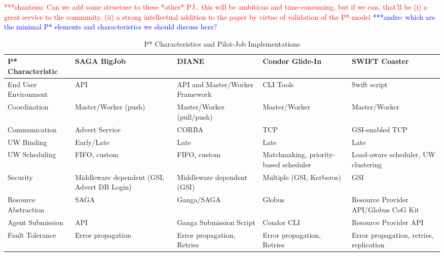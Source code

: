 \documentclass[conference,final]{IEEEtran}
\newcommand{\jhanote}[1]{ {\textcolor{red} { ***shantenu: #1 }}}
\newcommand{\alnote}[1]{ {\textcolor{blue} { ***andre: #1 }}}
\newcommand{\alnote}[1]{}
\newcommand{\jhanote}[1]{}
\begin{document}
\jhanote{Can we add some structure to these *other* PJ.. this will be
  ambitious and time-consuming, but if we can, that'll be (i) a great
  service to the community, (ii) a strong intellectual addition to the
  paper by virtue of validation of the P*-model} \alnote{which are the minimal P* elements and characteristics we should discuss here?}



\begin{table}[t]
\centering
\begin{tabular}{|l|p{2.5cm}|p{2.5cm}|p{2.5cm}|p{2.5cm}|}
	\hline
	\textbf{P* Characteristic}
	&\textbf{SAGA BigJob} &\textbf{DIANE} &\textbf{Condor Glide-In} &   
	\textbf{SWIFT Coaster} \\ \hline
End User Environment &API &API and Master/Worker Framework &CLI Tools &Swift script\\ \hline

Coordination &Master/Worker (push) &Master/Worker (pull/push) &Master/Worker &Master/Worker \\ \hline
	
Communication &Advert Service &CORBA &TCP &GSI-enabled TCP \\ \hline

UW Binding &Early/Late &Late &Late &Late\\
\hline
UW Scheduling &FIFO, custom &FIFO, custom &Matchmaking, priority-based scheduler 
&Load-aware scheduler, UW clustering\\
\hline

Security &Middleware dependent (GSI, Advert DB Login) &Middleware dependent (GSI) &Multiple (GSI, 
Kerberos) &GSI\\ \hline

Resource Abstraction &SAGA &Ganga/SAGA &Globus &Resource Provider API/Globus CoG 
Kit \\ 
\hline
Agent Submission &API &Ganga Submission Script &Condor CLI 
&Resource Provider API\\
\hline
Fault Tolerance &Error propagation &Error propagation, Retries &Error propagation, Retries &Error propagation, retries, replication\\
\hline
	
\end{tabular}
\caption{P* Characteristics and Pilot-Job Implementations}\label{table:pilot-job-comparison}
\end{table}
\end{document}
